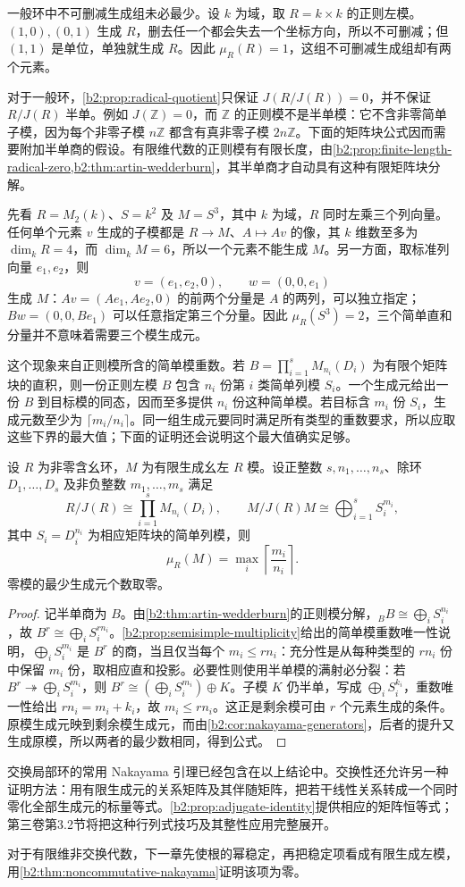 一般环中不可删减生成组未必最少。设 \(k\) 为域，取 \(R=k\times k\) 的正则左模。\((1,0),(0,1)\) 生成 \(R\)，删去任一个都会失去一个坐标方向，所以不可删减；但 \((1,1)\) 是单位，单独就生成 \(R\)。因此 \(\mu_R(R)=1\)，这组不可删减生成组却有两个元素。

\ProseParagraphBreak
对于一般环，\cref{b2:prop:radical-quotient}只保证 \(J(R/J(R))=0\)，并不保证 \(R/J(R)\) 半单。例如 \(J(\mathbb Z)=0\)，而 \(\mathbb Z\) 的正则模不是半单模：它不含非零简单子模，因为每个非零子模 \(n\mathbb Z\) 都含有真非零子模 \(2n\mathbb Z\)。下面的矩阵块公式因而需要附加半单商的假设。有限维代数的正则模有有限长度，由\cref{b2:prop:finite-length-radical-zero,b2:thm:artin-wedderburn}，其半单商才自动具有这种有限矩阵块分解。

\ProseParagraphBreak
先看 \(R=M_2(k)\)、\(S=k^2\) 及 \(M=S^3\)，其中 \(k\) 为域，\(R\) 同时左乘三个列向量。任何单个元素 \(v\) 生成的子模都是 \(R\to M\)、\(A\mapsto Av\) 的像，其 \(k\) 维数至多为 \(\dim_kR=4\)，而 \(\dim_kM=6\)，所以一个元素不能生成 \(M\)。另一方面，取标准列向量 \(e_1,e_2\)，则
\[
	v=(e_1,e_2,0),\qquad w=(0,0,e_1)
\]
生成 \(M\)：\(Av=(Ae_1,Ae_2,0)\) 的前两个分量是 \(A\) 的两列，可以独立指定；\(Bw=(0,0,Be_1)\) 可以任意指定第三个分量。因此 \(\mu_R(S^3)=2\)，三个简单直和分量并不意味着需要三个模生成元。

\ProseParagraphBreak
这个现象来自正则模所含的简单模重数。若 \(B=\prod_{i=1}^sM_{n_i}(D_i)\) 为有限个矩阵块的直积，则一份正则左模 \(B\) 包含 \(n_i\) 份第 \(i\) 类简单列模 \(S_i\)。一个生成元给出一份 \(B\) 到目标模的同态，因而至多提供 \(n_i\) 份这种简单模。若目标含 \(m_i\) 份 \(S_i\)，生成元数至少为 \(\lceil m_i/n_i\rceil\)。同一组生成元要同时满足所有类型的重数要求，所以应取这些下界的最大值；下面的证明还会说明这个最大值确实足够。

\begin{proposition}\label{b2:prop:semisimple-top-generators}
	设 \(R\) 为非零含幺环，\(M\) 为有限生成幺左 \(R\) 模。设正整数 \(s,n_1,\ldots,n_s\)、除环 \(D_1,\ldots,D_s\) 及非负整数 \(m_1,\ldots,m_s\) 满足
	\[
		R/J(R)\cong\prod_{i=1}^s M_{n_i}(D_i),\qquad M/J(R)M\cong\bigoplus_{i=1}^s S_i^{m_i},
	\]
	其中 \(S_i=D_i^{n_i}\) 为相应矩阵块的简单列模，则
	\[
		\mu_R(M)=\max_i\left\lceil\frac{m_i}{n_i}\right\rceil.
	\]
	零模的最少生成元个数取零。
\end{proposition}
\begin{proof}
	记半单商为 \(B\)。由\cref{b2:thm:artin-wedderburn}的正则模分解，\({}_BB\cong\bigoplus_i S_i^{n_i}\)，故 \(B^r\cong\bigoplus_i S_i^{rn_i}\)。\cref{b2:prop:semisimple-multiplicity}给出的简单模重数唯一性说明，\(\bigoplus_iS_i^{m_i}\) 是 \(B^r\) 的商，当且仅当每个 \(m_i\le rn_i\)：充分性是从每种类型的 \(rn_i\) 份中保留 \(m_i\) 份，取相应直和投影。必要性则使用半单模的满射必分裂：若 \(B^r\twoheadrightarrow\bigoplus_iS_i^{m_i}\)，则 \(B^r\cong(\bigoplus_iS_i^{m_i})\oplus K\)。子模 \(K\) 仍半单，写成 \(\bigoplus_iS_i^{k_i}\)，重数唯一性给出 \(rn_i=m_i+k_i\)，故 \(m_i\le rn_i\)。这正是剩余模可由 \(r\) 个元素生成的条件。原模生成元映到剩余模生成元，而由\cref{b2:cor:nakayama-generators}，后者的提升又生成原模，所以两者的最少数相同，得到公式。
\end{proof}

交换局部环的常用 Nakayama 引理已经包含在以上结论中。交换性还允许另一种证明方法：用有限生成元的关系矩阵及其伴随矩阵，把若干线性关系转成一个同时零化全部生成元的标量等式。\cref{b2:prop:adjugate-identity}提供相应的矩阵恒等式；第三卷第3.2节将把这种行列式技巧及其整性应用完整展开。

\ProseParagraphBreak
对于有限维非交换代数，下一章先使根的幂稳定，再把稳定项看成有限生成左模，用\cref{b2:thm:noncommutative-nakayama}证明该项为零。
